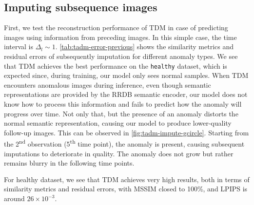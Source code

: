 
\subsection{Imputing subsequence images}
First, we test the reconstruction performance of \ac{TDM} in case of predicting images using information from preceding images. In this simple case, the time interval is $\Delta_l \sim 1$. \cref{tab:tadm-error-previous} shows the similarity metrics and residual errors of subsequently imputation for different anomaly types. We see that \ac{TDM} achieves the best performance on the \texttt{healthy} dataset, which is expected since, during training, our model only sees normal samples. When \ac{TDM} encounters anomalous images during inference, even though semantic representations are provided by the RRDB semantic encoder, our model does not know how to process this information and fails to predict how the anomaly will progress over time. Not only that, but the presence of an anomaly distorts the normal semantic representation, causing our model to produce lower-quality follow-up images. This can be observed in \cref{fig:tadm-impute-gcircle}. Starting from the 2\textsuperscript{nd} observation (5\textsuperscript{th} time point), the anomaly is present, causing subsequent imputations to deteriorate in quality. The anomaly does not grow but rather remains blurry in the following time points.

For healthy dataset, we see that \ac{TDM} achieves very high results, both in terms of similarity metrics and residual errors, with MSSIM closed to 100\%, and LPIPS is around $26 \times 10^{-3}$. 

